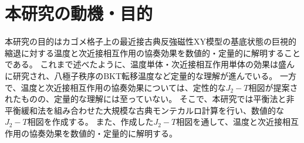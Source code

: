\documentclass[12pt,titlepage,dvipdfmx]{jarticle}
\begin{document}
\newpage

\section{本研究の動機・目的}
本研究の目的はカゴメ格子上の最近接古典反強磁性XY模型の基底状態の巨視的縮退に対する温度と次近接相互作用の協奏効果を数値的・定量的に解明することである。
これまで述べたように、温度単体・次近接相互作用単体の効果は盛んに研究され、八極子秩序のBKT転移温度など定量的な理解が進んでいる。
一方で、温度と次近接相互作用の協奏効果については、定性的な$J_2-T$相図が提案されたものの、定量的な理解には至っていない。
そこで、本研究では平衡法と非平衡緩和法を組み合わせた大規模な古典モンテカルロ計算を行い、数値的な$J_2-T$相図を作成する。
また、作成した$J_2-T$相図を通して、温度と次近接相互作用の協奏効果を数値的・定量的に解明する。
%
%
%
\end{document}
